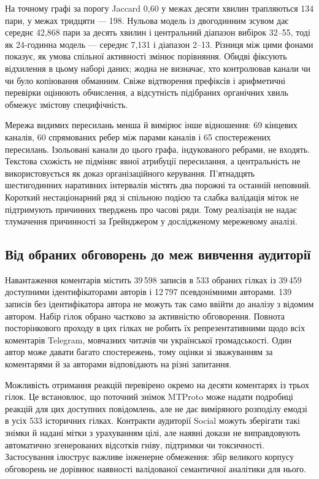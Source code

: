 На точному графі за порогу Jaccard 0,60 у межах десяти хвилин трапляються 134 пари, у межах тридцяти --- 198. Нульова модель із двогодинним зсувом дає середнє 42,868 пари за десять хвилин і центральний діапазон вибірок 32--55, тоді як 24-годинна модель --- середнє 7,131 і діапазон 2--13. Різниця між цими фонами показує, як умова спільної активності змінює порівняння. Обидві фіксують відхилення в цьому наборі даних; жодна не визначає, хто контролював канали чи чи було копіювання обманним. Свіже відтворення префіксів і арифметичні перевірки оцінюють обчислення, а відсутність підібраних органічних хвиль обмежує змістову специфічність.

Мережа видимих пересилань менша й вимірює інше відношення: 69 кінцевих каналів, 60 спрямованих ребер між парами каналів і 65 спостережених пересилань. Ізольовані канали до цього графа, індукованого ребрами, не входять. Текстова схожість не підміняє явної атрибуції пересилання, а центральність не використовується як доказ організаційного керування. П'ятнадцять шестигодинних наративних інтервалів містять два порожні та останній неповний. Короткий нестаціонарний ряд зі спільною подією та слабка валідація міток не підтримують причинних тверджень про часові ряди. Тому реалізація не надає тлумачення причинності за Ґрейнджером у дослідженому мережевому аналізі.

\subsection{Від обраних обговорень до меж вивчення аудиторії}
Навантаження коментарів містить 39\,598 записів в 533 обраних гілках із 39\,459 доступними ідентифікаторами авторів і 12\,797 псевдонімними авторами. 139 записів без ідентифікатора автора не можуть так само ввійти до аналізу з відомим автором. Набір гілок обрано частково за активністю обговорення. Повнота посторінкового проходу в цих гілках не робить їх репрезентативними щодо всіх коментарів Telegram, мовчазних читачів чи української громадськості. Один автор може давати багато спостережень, тому оцінки зі зважуванням за коментарями й за авторами відповідають на різні запитання.

Можливість отримання реакцій перевірено окремо на десяти коментарях із трьох гілок. Це встановлює, що поточний знімок MTProto може надати подробиці реакцій для цих доступних повідомлень, але не дає виміряного розподілу емодзі в усіх 533 історичних гілках. Контракти аудиторії Social можуть зберігати такі знімки й надані мітки з урахуванням цілі, але наявні докази не виправдовують автоматично згенерованих відсотків гніву, підтримки чи токсичності. Застосування ілюструє важливе інженерне обмеження: збір великого корпусу обговорень не дорівнює наявності валідованої семантичної аналітики для нього.

